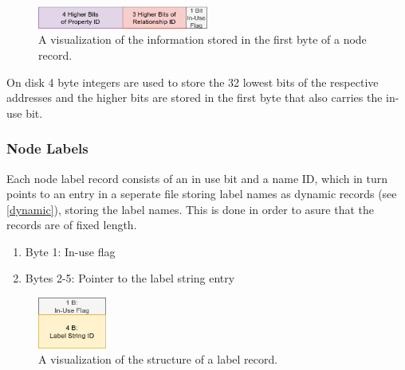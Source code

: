 \documentclass[a4paper,10pt]{article}
\begin{document}
    \begin{figure}[htp]\label{node_first_byte}
        \begin{center}
        \includegraphics[keepaspectratio,height=0.4\textheight,width=0.5\textwidth]{img/node/node_first_byte.png}
        \end{center}
        \caption{A visualization of the information stored in the first byte of a node record.} %
    \end{figure}
    
    On disk 4 byte integers are used to store the 32 lowest bits of the respective addresses and the higher bits are stored in the first byte that also carries the in-use bit.
    
    \subsubsection{Node Labels}
    Each node label record consists of an in use bit and a name ID, which in turn points to an entry in a seperate file storing label names as dynamic records (see \ref{dynamic}), storing the label names. This is done in order to asure that the records are of fixed length.
    \begin{enumerate}
     \item Byte 1: In-use flag
     \item Bytes 2-5: Pointer to the label string entry
    \end{enumerate}
    
    \begin{figure}[htp]\label{label_record}
        \begin{center}
            \includegraphics[keepaspectratio,height=0.2\textheight,width=0.2\textwidth]{img/node/label_record.png}
        \end{center}
        \caption{A visualization of the structure of a label record.} %
    \end{figure}
    
    
    
\end{document}
